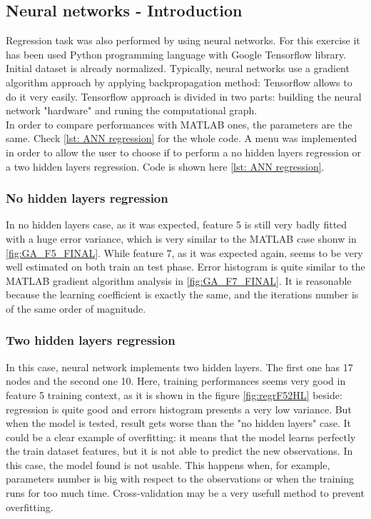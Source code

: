 \documentclass{article}
\begin{document}
\newpage
\subsection{Neural networks - Introduction}
Regression task was also performed by using neural networks. For this exercise it has been used Python programming language with Google Tensorflow library. Initial dataset is already normalized. Typically, neural networks use a gradient algorithm approach by applying backpropagation method: Tensorflow allows to do it very easily. Tensorflow approach is divided in two parts: building the neural network "hardware" and runing the computational graph.\\
In order to compare performances with MATLAB ones, the parameters are the same. Check \ref{lst: ANN regression} for the whole code. A menu was implemented in order to allow the user to choose if to perform a no hidden layers regression or a two hidden layers regression. Code is shown here \ref{lst: ANN regression}.

\subsubsection{No hidden layers regression}
In no hidden layers case, as it was expected, feature 5 is still very badly fitted with a huge error variance, which is very similar to the MATLAB case shonw in \ref{fig:GA_F5_FINAL}. While feature 7, as it was expected again, seems to be very well estimated on both train an test phase. Error histogram is quite similar to the MATLAB gradient algorithm analysis in \ref{fig:GA_F7_FINAL}. It is reasonable because the learning coefficient is exactly the same, and the iterations number is of the same order of magnitude. 

\subsubsection{Two hidden layers regression}
In this case, neural network implements two hidden layers. The first one has 17 nodes and the second one 10. Here, training performances seems very good in feature 5  training context, as it is shown in the figure \ref{fig:regrF52HL} beside: regression is quite good and errors histogram presents a very low variance. But when the model is tested, result gets worse than the "no hidden layers" case. It could be a clear example of overfitting: it means that the model learns perfectly the train dataset features, but it is not able to predict the new observations. In this case, the model found is not usable. This happens when, for example, parameters number is big with respect to the observations or when the training runs for too much time. Cross-validation may be a very usefull method to prevent overfitting.
\end{document}
